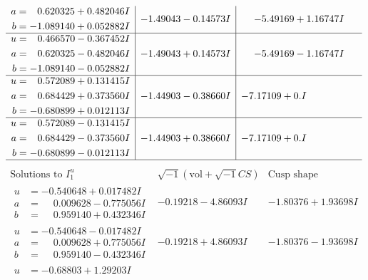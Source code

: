 \documentclass[1p]{elsarticle_modified}
\theoremstyle{definition}
\newcommand{\I}{\sqrt{-1}}
\begin{document}
$$\begin{array}{c|c|c}
\begin{aligned}
a &= \phantom{-}0.620325 + 0.482046 I \\
b &= -1.089140 + 0.052882 I\end{aligned}
 & -1.49043 - 0.14573 I & -5.49169 + 1.16747 I \\ \hline\begin{aligned}
u &= \phantom{-}0.466570 - 0.367452 I \\
a &= \phantom{-}0.620325 - 0.482046 I \\
b &= -1.089140 - 0.052882 I\end{aligned}
 & -1.49043 + 0.14573 I & -5.49169 - 1.16747 I \\ \hline\begin{aligned}
u &= \phantom{-}0.572089 + 0.131415 I \\
a &= \phantom{-}0.684429 + 0.373560 I \\
b &= -0.680899 + 0.012113 I\end{aligned}
 & -1.44903 - 0.38660 I & -7.17109 + 0. I\phantom{ +0.000000I} \\ \hline\begin{aligned}
u &= \phantom{-}0.572089 - 0.131415 I \\
a &= \phantom{-}0.684429 - 0.373560 I \\
b &= -0.680899 - 0.012113 I\end{aligned}
 & -1.44903 + 0.38660 I & -7.17109 + 0. I\phantom{ +0.000000I}\\
 \hline 
 \end{array}$$\newpage$$\begin{array}{c|c|c}  
\text{Solutions to }I^u_{1}& \I (\text{vol} + \sqrt{-1}CS) & \text{Cusp shape}\\
 \hline 
\begin{aligned}
u &= -0.540648 + 0.017482 I \\
a &= \phantom{-}0.009628 - 0.775056 I \\
b &= \phantom{-}0.959140 + 0.432346 I\end{aligned}
 & -0.19218 - 4.86093 I & -1.80376 + 1.93698 I \\ \hline\begin{aligned}
u &= -0.540648 - 0.017482 I \\
a &= \phantom{-}0.009628 + 0.775056 I \\
b &= \phantom{-}0.959140 - 0.432346 I\end{aligned}
 & -0.19218 + 4.86093 I & -1.80376 - 1.93698 I \\ \hline\begin{aligned}
u &= -0.68803 + 1.29203 I \\

\end{aligned}
\end{array}$$
\end{document}
